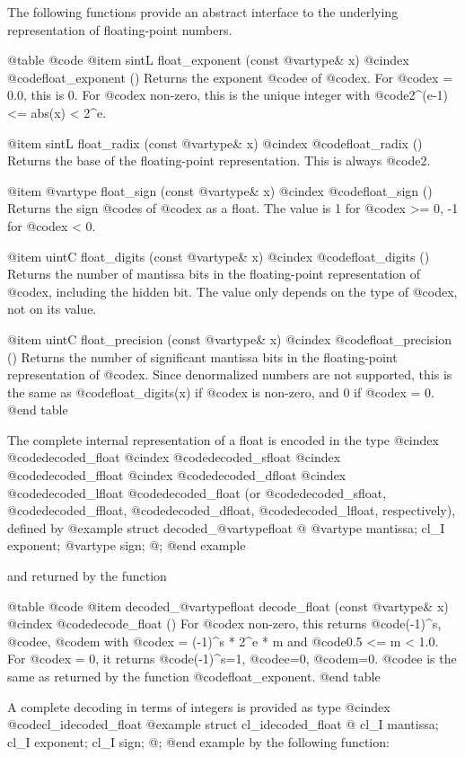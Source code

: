 The following functions provide an abstract interface to the underlying
representation of floating-point numbers.

@table @code
@item sintL float_exponent (const @var{type}& x)
@cindex @code{float_exponent ()}
Returns the exponent @code{e} of @code{x}.
For @code{x = 0.0}, this is 0. For @code{x} non-zero, this is the unique
integer with @code{2^(e-1) <= abs(x) < 2^e}.

@item sintL float_radix (const @var{type}& x)
@cindex @code{float_radix ()}
Returns the base of the floating-point representation. This is always @code{2}.

@item @var{type} float_sign (const @var{type}& x)
@cindex @code{float_sign ()}
Returns the sign @code{s} of @code{x} as a float. The value is 1 for
@code{x} >= 0, -1 for @code{x} < 0.

@item uintC float_digits (const @var{type}& x)
@cindex @code{float_digits ()}
Returns the number of mantissa bits in the floating-point representation
of @code{x}, including the hidden bit. The value only depends on the type
of @code{x}, not on its value.

@item uintC float_precision (const @var{type}& x)
@cindex @code{float_precision ()}
Returns the number of significant mantissa bits in the floating-point
representation of @code{x}. Since denormalized numbers are not supported,
this is the same as @code{float_digits(x)} if @code{x} is non-zero, and
0 if @code{x} = 0.
@end table

The complete internal representation of a float is encoded in the type
@cindex @code{decoded_float}
@cindex @code{decoded_sfloat}
@cindex @code{decoded_ffloat}
@cindex @code{decoded_dfloat}
@cindex @code{decoded_lfloat}
@code{decoded_float} (or @code{decoded_sfloat}, @code{decoded_ffloat},
@code{decoded_dfloat}, @code{decoded_lfloat}, respectively), defined by
@example
struct decoded_@var{type}float @{
        @var{type} mantissa; cl_I exponent; @var{type} sign;
@};
@end example

and returned by the function

@table @code
@item decoded_@var{type}float decode_float (const @var{type}& x)
@cindex @code{decode_float ()}
For @code{x} non-zero, this returns @code{(-1)^s}, @code{e}, @code{m} with
@code{x = (-1)^s * 2^e * m} and @code{0.5 <= m < 1.0}. For @code{x} = 0,
it returns @code{(-1)^s}=1, @code{e}=0, @code{m}=0.
@code{e} is the same as returned by the function @code{float_exponent}.
@end table

A complete decoding in terms of integers is provided as type
@cindex @code{cl_idecoded_float}
@example
struct cl_idecoded_float @{
        cl_I mantissa; cl_I exponent; cl_I sign;
@};
@end example
by the following function:

